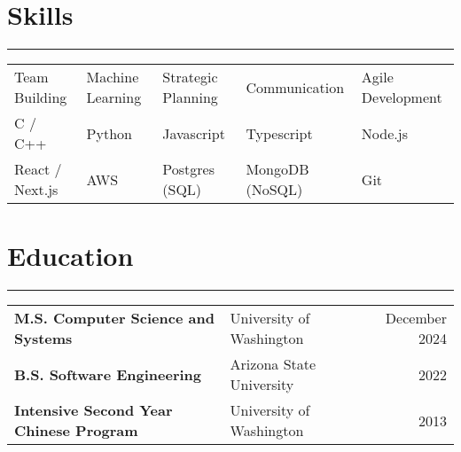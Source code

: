 \documentclass[letterpaper,11pt]{article}
\begin{document}
\section*{Skills}
\hrule
\begin{tabularx}{\linewidth}{@{}YYYYY@{}}
  Team Building   & Machine Learning & Strategic Planning & Communication   & Agile Development \\
  C / C++         & Python           & Javascript         & Typescript      & Node.js           \\
  React / Next.js & AWS              & Postgres (SQL)     & MongoDB (NoSQL) & Git               \\
\end{tabularx}

\vspace{-5px}
\section*{Education}
\hrule
\begin{tabularx}{\linewidth}{@{}XXr@{}}
  \textbf{M.S. Computer Science and Systems}     & University of Washington & December 2024 \\
  \textbf{B.S. Software Engineering}             & Arizona State University & 2022          \\
  \textbf{Intensive Second Year Chinese Program} & University of Washington & 2013          \\
\end{tabularx}
\end{document}
